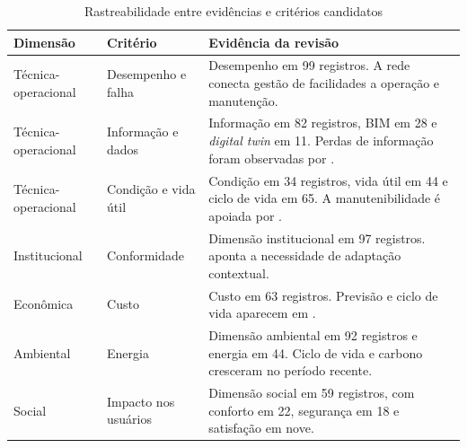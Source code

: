 \begin{table}[htbp]
\centering
\caption{Rastreabilidade entre evidências e critérios candidatos}
\label{tab:protocolooperacional}
\scriptsize
\begin{tabularx}{\textwidth}{>{\RaggedRight\arraybackslash}p{2.4cm} >{\RaggedRight\arraybackslash}p{2.7cm} Y}
\toprule
Dimensão & Critério & Evidência da revisão \\
\midrule
Técnica-operacional & Desempenho e falha & Desempenho em 99 registros. A rede conecta gestão de facilidades a operação e manutenção. \\
Técnica-operacional & Informação e dados & Informação em 82 registros, BIM em 28 e \textit{digital twin} em 11. Perdas de informação foram observadas por \textcite{tan_fluxoinformacao_2018}. \\
Técnica-operacional & Condição e vida útil & Condição em 34 registros, vida útil em 44 e ciclo de vida em 65. A manutenibilidade é apoiada por \textcite{othman_manutenibilidadeesi_2023}. \\
Institucional & Conformidade & Dimensão institucional em 97 registros. \textcite{talib_hospitalfm_2013} aponta a necessidade de adaptação contextual. \\
Econômica & Custo & Custo em 63 registros. Previsão e ciclo de vida aparecem em \textcite{kim_estimativacustoseducacional_2018,nageli_ciclovida_2019}. \\
Ambiental & Energia & Dimensão ambiental em 92 registros e energia em 44. Ciclo de vida e carbono cresceram no período recente. \\
Social & Impacto nos usuários & Dimensão social em 59 registros, com conforto em 22, segurança em 18 e satisfação em nove. \\
\bottomrule
\end{tabularx}
\fonteautor
\end{table}

